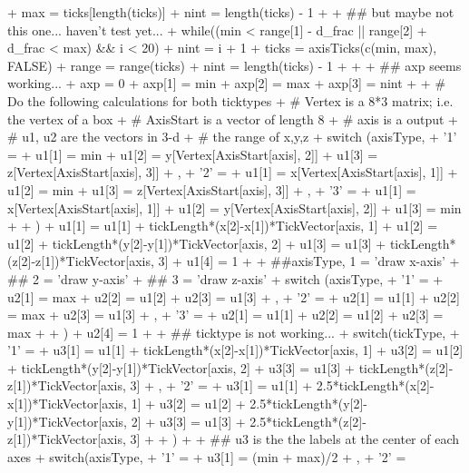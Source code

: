 \documentclass[paper=a4, fontsize=11pt]{report}
\begin{document}
\begin{Schunk}
\begin{Sinput}
{+     max = ticks[length(ticks)]
+     nint = length(ticks) - 1
+             
+     ## but maybe not this one... haven't test yet...
+     while((min < range[1] - d_frac || range[2] + d_frac < max) && i < 20) {
+         nint = i + 1
+         ticks = axisTicks(c(min, max), FALSE)
+         range = range(ticks)
+         nint = length(ticks) - 1
+     }
+     
+     ## axp seems working...
+     axp = 0
+     axp[1] = min
+     axp[2] = max
+     axp[3] = nint
+     
+     # Do the following calculations for both ticktypes
+     # Vertex is a 8*3 matrix; i.e. the vertex of a box
+     # AxisStart is a vector of length 8
+     # axis is a output 
+     # u1, u2 are the vectors in 3-d 
+     # the range of x,y,z
+     switch (axisType,
+         '1' = {
+           u1[1] = min
+           u1[2] = y[Vertex[AxisStart[axis], 2]]
+           u1[3] = z[Vertex[AxisStart[axis], 3]]
+         },
+         '2' = {
+           u1[1] = x[Vertex[AxisStart[axis], 1]]
+           u1[2] = min
+           u1[3] = z[Vertex[AxisStart[axis], 3]]
+         },
+         '3' = {
+           u1[1] = x[Vertex[AxisStart[axis], 1]]
+           u1[2] = y[Vertex[AxisStart[axis], 2]]
+           u1[3] = min
+         }
+     )
+     u1[1] = u1[1] + tickLength*(x[2]-x[1])*TickVector[axis, 1]
+     u1[2] = u1[2] + tickLength*(y[2]-y[1])*TickVector[axis, 2]
+     u1[3] = u1[3] + tickLength*(z[2]-z[1])*TickVector[axis, 3]
+     u1[4] = 1
+ 
+     ##axisType, 1 = 'draw x-axis'
+     ##          2 = 'draw y-axis'
+     ##          3 = 'draw z-axis'
+     switch (axisType,
+         '1' = {
+         u2[1] = max
+         u2[2] = u1[2]
+         u2[3] = u1[3]
+         },
+         '2' = {
+         u2[1] = u1[1]
+         u2[2] = max
+         u2[3] = u1[3]
+         },
+         '3' = {
+         u2[1] = u1[1]
+         u2[2] = u1[2]
+         u2[3] = max
+         }
+     )
+     u2[4] = 1
+ 
+     ## ticktype is not working...
+     switch(tickType,
+         '1' = { 
+         u3[1] = u1[1] + tickLength*(x[2]-x[1])*TickVector[axis, 1]
+         u3[2] = u1[2] + tickLength*(y[2]-y[1])*TickVector[axis, 2]
+         u3[3] = u1[3] + tickLength*(z[2]-z[1])*TickVector[axis, 3]
+         },
+         '2' = {
+         u3[1] = u1[1] + 2.5*tickLength*(x[2]-x[1])*TickVector[axis, 1]
+         u3[2] = u1[2] + 2.5*tickLength*(y[2]-y[1])*TickVector[axis, 2]
+         u3[3] = u1[3] + 2.5*tickLength*(z[2]-z[1])*TickVector[axis, 3]
+         }
+     )
+ 
+     ## u3 is the the labels at the center of each axes
+     switch(axisType,
+         '1' = {
+         u3[1] = (min + max)/2
+         },
+         '2' = {
}}
\end{Sinput}
\end{Schunk}
\end{document}

